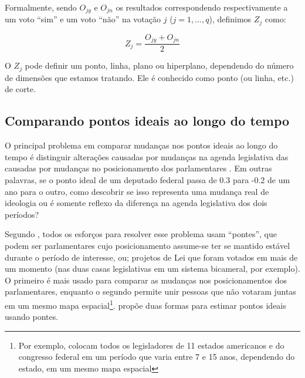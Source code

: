 Formalmente, sendo $O_{jy}$ e $O_{jn}$ os resultados correspondendo
respectivamente a um voto ``sim'' e um voto ``não'' na votação $j$ ($j = 1,
..., q$), definimos $Z_j$ como: 

\begin{equation}\label{eq:cutpoint}
  Z_j = \frac{O_{jy} + O_{jn}}{2}
\end{equation}

O $Z_j$ pode definir um ponto, linha, plano ou hiperplano, dependendo do número
de dimensões que estamos tratando. Ele é conhecido como ponto (ou linha, etc.)
de corte.







\subsection{Comparando pontos ideais ao longo do tempo}
\label{cap:fundamentacao:comparando-pontos-ideais-no-tempo}

O principal problema em comparar mudanças nos pontos ideais ao longo do tempo é
distinguir alterações causadas por mudanças na agenda legislativa das causadas
por mudanças no posicionamento dos parlamentares \cite{Bailey2007}. Em outras
palavras, se o ponto ideal de um deputado federal passa de 0.3 para -0.2 de um ano
para o outro, como descobrir se isso representa uma mudança real de ideologia ou
é somente reflexo da diferença na agenda legislativa dos dois períodos?

Segundo , todos os esforços para resolver esse problema
usam ``pontes'', que podem ser parlamentares cujo posicionamento assume-se ter
se mantido estável durante o período de interesse, ou; projetos de Lei que
foram votados em mais de um momento (nas duas casas legislativas em um sistema
bicameral, por exemplo). O primeiro é mais usado para comparar as mudanças nos
posicionamentos dos parlamentares, enquanto o segundo permite unir pessoas que
não votaram juntas em um mesmo mapa espacial\footnote{Por exemplo,
 colocam todos os legisladores de 11 estados americanos e
do congresso federal em um período que varia entre 7 e 15 anos, dependendo do
estado, em um mesmo mapa espacial}.  propõe duas formas
para estimar pontos ideais usando pontes.

